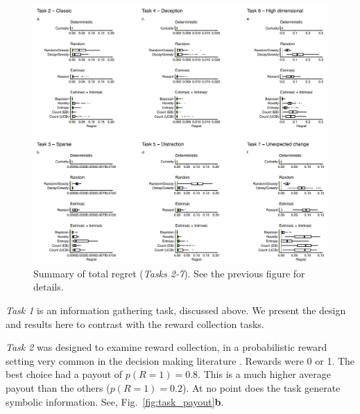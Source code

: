 \begin{figure}
    \label{fig:supp_regret} 
	\includegraphics[width=11.4cm]{img/supp_regret.pdf} 
	\caption{Summary of total regret (\textit{Tasks 2-7}). See the previous figure for details.}
\end{figure}


\textit{Task 1} is an information gathering task, discussed above. We present the design and results here to contrast with the reward collection tasks. 

\textit{Task 2} was designed to examine reward collection, in a probabilistic reward setting very common in the decision making literature \cite{schonberg2007reinforcement,frank2004carrot,cavanagh2014conflict,jahfari2019cross,collins2014opponent,collins2017interactions,glascher2010states}. Rewards were 0 or 1. The best choice had a payout of $p(R=1) = 0.8$. This is a much higher average payout than the others ($p(R=1) = 0.2$). At no point does the task generate symbolic information. See, Fig.~\ref{fig:task_payout}\textbf{b}. 
 
